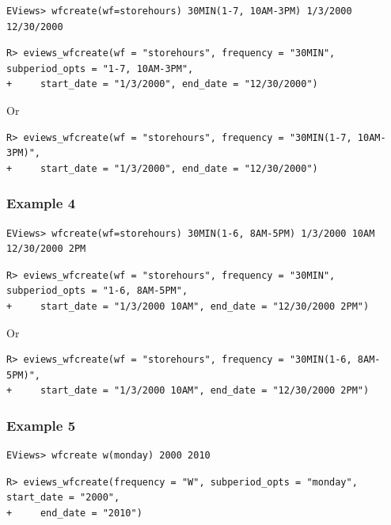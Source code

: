 \begin{verbatim}
EViews> wfcreate(wf=storehours) 30MIN(1-7, 10AM-3PM) 1/3/2000 12/30/2000
\end{verbatim}

\begin{verbatim}
R> eviews_wfcreate(wf = "storehours", frequency = "30MIN", subperiod_opts = "1-7, 10AM-3PM",
+     start_date = "1/3/2000", end_date = "12/30/2000")
\end{verbatim}

Or

\begin{verbatim}
R> eviews_wfcreate(wf = "storehours", frequency = "30MIN(1-7, 10AM-3PM)",
+     start_date = "1/3/2000", end_date = "12/30/2000")
\end{verbatim}

\hypertarget{example-4-2}{%
\subsubsection{Example 4}\label{example-4-2}}

\begin{verbatim}
EViews> wfcreate(wf=storehours) 30MIN(1-6, 8AM-5PM) 1/3/2000 10AM 12/30/2000 2PM
\end{verbatim}

\begin{verbatim}
R> eviews_wfcreate(wf = "storehours", frequency = "30MIN", subperiod_opts = "1-6, 8AM-5PM",
+     start_date = "1/3/2000 10AM", end_date = "12/30/2000 2PM")
\end{verbatim}

Or

\begin{verbatim}
R> eviews_wfcreate(wf = "storehours", frequency = "30MIN(1-6, 8AM-5PM)",
+     start_date = "1/3/2000 10AM", end_date = "12/30/2000 2PM")
\end{verbatim}

\hypertarget{example-5-2}{%
\subsubsection{Example 5}\label{example-5-2}}

\begin{verbatim}
EViews> wfcreate w(monday) 2000 2010
\end{verbatim}

\begin{verbatim}
R> eviews_wfcreate(frequency = "W", subperiod_opts = "monday", start_date = "2000",
+     end_date = "2010")
\end{verbatim}

